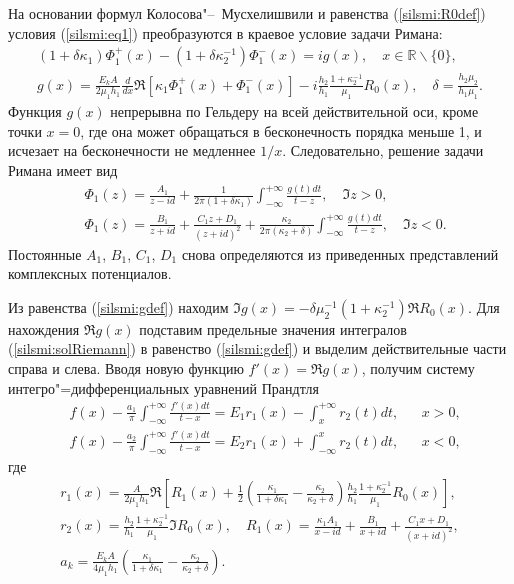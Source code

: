 На основании формул Колосова"--~Мусхелишвили и равенства (\ref{silsmi:R0def}) условия (\ref{silsmi:eq1}) преобразуются в краевое
условие задачи Римана:
\begin{gather}
\label{silsmi:eqRiemann}
(1+\delta\kappa_1)\Phi_1^+(x)-(1+\delta\kappa_2^{-1})\Phi_1^-(x)=i g(x),\quad x\in\mathbb{R}\backslash\{0\},\\
g(x)=\frac{E_kA}{2\mu_1h_1}\frac{d}{dx}\Re\left[\kappa_1\Phi_1^+(x)+\Phi_1^-(x)\right]-i
\frac{h_2}{h_1}\frac{1+\kappa_2^{-1}}{\mu_1}R_0(x),\quad \delta=\frac{h_2\mu_2}{h_1\mu_1}. \label{silsmi:gdef}
\end{gather}
Функция $g(x)$ непрерывна по Гельдеру на всей действительной оси, кроме точки $x=0$, где она может обращаться в бесконечность
порядка меньше 1, и исчезает на бесконечности не медленнее $1/x$. Следовательно, решение задачи Римана имеет вид
\begin{equation}
\label{silsmi:solRiemann}
\begin{aligned}
&\Phi_1(z)=\frac{A_1}{z-id}+\frac1{2\pi(1+\delta\kappa_1)}\int _{-\infty}^{+\infty}\frac{g(t)dt}{t-z},\quad \Im z>0,\\
&\Phi_1(z)=\frac{B_1}{z+id}+\frac{C_1z+D_1}{(z+id)^2}+\frac{\kappa_2}{2\pi(\kappa_2+\delta)}\int _{-\infty}^{+\infty}\frac{g(t)dt}{t-z},\quad \Im z<0.
\end{aligned}
\end{equation}
Постоянные $A_1$, $B_1$, $C_1$, $D_1$ снова определяются из приведенных представлений комплексных потенциалов.

Из равенства (\ref{silsmi:gdef}) находим $\Im g(x)=-\delta\mu_2^{-1}(1+\kappa_2^{-1})\Re R_0(x)$. Для нахождения $\Re g(x)$
подставим предельные значения интегралов (\ref{silsmi:solRiemann}) в равенство (\ref{silsmi:gdef}) и выделим действительные части
справа и слева. Вводя новую функцию $f'(x)=\Re g(x)$, получим систему интегро"=дифференциальных уравнений Прандтля
\begin{equation}
\label{silsmi:eqPrandtl}
\begin{aligned}
&f(x)-\frac{a_1}{\pi}\int _{-\infty}^{+\infty}\frac{f'(x)dt}{t-x}=E_1 r_1(x)-\int _x^{+\infty}r_2(t)dt,& & x>0,\\
&f(x)-\frac{a_2}{\pi}\int _{-\infty}^{+\infty}\frac{f'(x)dt}{t-x}=E_2 r_1(x)+\int _{-\infty}^{x}r_2(t)dt,& & x<0,
\end{aligned}
\end{equation}
где
\begin{gather*}
r_1(x)=\frac{A}{2\mu_1h_1}\Re\left[R_1(x)+\frac12\left(\frac{\kappa_1}{1+\delta\kappa_1}-\frac{\kappa_2}{\kappa_2+\delta}\right)\frac{h_2}{h_1}\frac{1+\kappa_2^{-1}}{\mu_1}R_0(x)\right],\\
r_2(x)=\frac{h_2}{h_1}\frac{1+\kappa_2^{-1}}{\mu_1}\Im R_0(x),\quad R_1(x)=\frac{\kappa_1A_1}{x-id}+\frac{B_1}{x+id}+\frac{C_1x+D_1}{(x+id)^2},\\
a_k=\frac{E_kA}{4\mu_1h_1}\left(\frac{\kappa_1}{1+\delta\kappa_1}-\frac{\kappa_2}{\kappa_2+\delta}\right).
\end{gather*}

